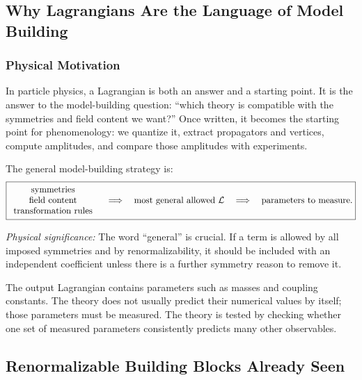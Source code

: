 \documentclass[../main.tex]{subfiles}
\begin{document}
\subsection*{Why Lagrangians Are the Language of Model Building}

\subsubsection*{Physical Motivation}

In particle physics, a Lagrangian is both an answer and a starting point.  It is the answer to the model-building question: ``which theory is compatible with the symmetries and field content we want?''  Once written, it becomes the starting point for phenomenology: we quantize it, extract propagators and vertices, compute amplitudes, and compare those amplitudes with experiments.

The general model-building strategy is:
\begin{equation}
  \boxed{
  \begin{array}{c}
    \text{symmetries} \\
    \text{field content} \\
    \text{transformation rules}
  \end{array}
  \quad\Longrightarrow\quad
  \text{most general allowed }\mathcal{L}
  \quad\Longrightarrow\quad
  \text{parameters to measure.}}
  \label{eq:lec09:model-building-flow}
\end{equation}

\textit{Physical significance:} The word ``general'' is crucial.  If a term is allowed by all imposed symmetries and by renormalizability, it should be included with an independent coefficient unless there is a further symmetry reason to remove it.

The output Lagrangian contains parameters such as masses and coupling constants.  The theory does not usually predict their numerical values by itself; those parameters must be measured.  The theory is tested by checking whether one set of measured parameters consistently predicts many other observables.

\subsection*{Renormalizable Building Blocks Already Seen}
\end{document}
